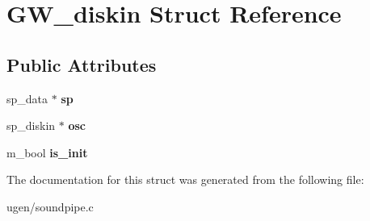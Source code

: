 \hypertarget{structGW__diskin}{}\section{G\+W\+\_\+diskin Struct Reference}
\label{structGW__diskin}
\subsection*{Public Attributes}
\begin{DoxyCompactItemize}
\item 
\hypertarget{structGW__diskin_a8e1c345baa0f519687bf913191d4944a}{}\label{structGW__diskin_a8e1c345baa0f519687bf913191d4944a} 
sp\+\_\+data $\ast$ {\bfseries sp}
\item 
\hypertarget{structGW__diskin_ae77cd733c463711dd278a52add9d65ee}{}\label{structGW__diskin_ae77cd733c463711dd278a52add9d65ee} 
sp\+\_\+diskin $\ast$ {\bfseries osc}
\item 
\hypertarget{structGW__diskin_ac51511f021ea12804d78067b67b56bd8}{}\label{structGW__diskin_ac51511f021ea12804d78067b67b56bd8} 
m\+\_\+bool {\bfseries is\+\_\+init}
\end{DoxyCompactItemize}


The documentation for this struct was generated from the following file\+:\begin{DoxyCompactItemize}
\item 
ugen/soundpipe.\+c\end{DoxyCompactItemize}

